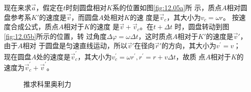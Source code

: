 现在来求$\vec{a}$，假定在$ t $时刻圆盘相对$ K $系的位置如图\ref{fig:12.05a}所
示，质点$ A $相对圆盘参考系$ K' $的速度是$\vec{v}$，而圆盘$ A $处相对$ K $的速
度是$\vec{v}_c$，其大小为$  v _ { c } = \omega r   $。
按速度合成公式，质点$ A $相对于$ K $的速度
是$ \vec{v}+\vec{v}_c $。在$  t + \Delta t  $ 时，圆盘转动到图\ref{fig:12.05b}所示的位置，转
过角度$  \Delta \varphi = \omega \Delta t   $，这时质点$ A $相对于$ K' $的速度是$ \vec{v}' $，由于$ A $相对
于圆盘是匀速直线运动，所以$ \vec{v} ' $在径向$\vec{r}'$的方向，其大小为$  v ^ { \prime } = v $；
现在圆盘$ A $处的速度是$ \vec{v} _ c ^ \prime $，其大小为$  v _ c ^ { \prime } = \omega r ^ { \prime } , r ^ { \prime } = r + v \Delta t $，故质
点$ A $相对于$ K $的速度为$ \vec{v} _ c ^ \prime + \vec{v} ^ \prime $。\vspace{-0.5em}
\begin{figure}[h]
    \centering
    \qquad
    \qquad
    \caption{推求科里奥利力}
    \label{fig:12.05}
\end{figure}

